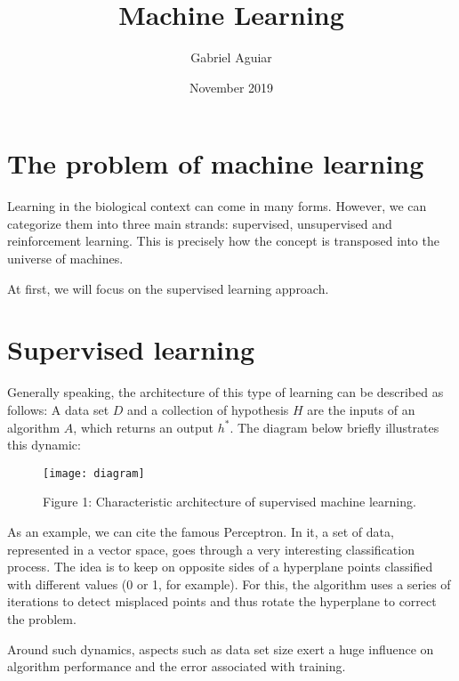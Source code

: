 \documentclass{article}
\title{Machine Learning}
\author{Gabriel Aguiar}
\date{November 2019}
\begin{document}
\maketitle

\section{The problem of machine learning}

\hfill

Learning in the biological context can come in many forms. However, we can categorize them into three main strands: supervised, unsupervised and reinforcement learning. This is precisely how the concept is transposed into the universe of machines.

\hfill

At first, we will focus on the supervised learning approach.

\section{Supervised learning}

\hfill

Generally speaking, the architecture of this type of learning can be described as follows: A data set $D$ and a collection of hypothesis $H$ are the inputs of an algorithm $A$, which returns an output $h^{*}$. The diagram below briefly illustrates this dynamic:

\begin{figure}[h!]

\texttt{[image: diagram]}

Figure 1: Characteristic architecture of supervised machine learning.

\end{figure}

\hfill

As an example, we can cite the famous Perceptron. In it, a set of data, represented in a vector space, goes through a very interesting classification process. The idea is to keep on opposite sides of a hyperplane points classified with different values (0 or 1, for example). For this, the algorithm uses a series of iterations to detect misplaced points and thus rotate the hyperplane to correct the problem.

\hfill

Around such dynamics, aspects such as data set size exert a huge influence on algorithm performance and the error associated with training.
\end{document}
